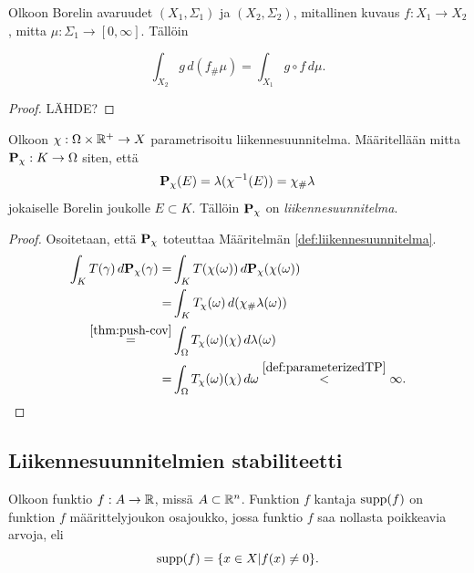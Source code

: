 \begin{theorem}\label{thm:push-cov}
    Olkoon Borelin avaruudet $(X_1, \Sigma_1)$ ja $(X_2, \Sigma_2)$, mitallinen kuvaus $f: X_1 \to X_2$, mitta $\mu:\Sigma_1 \to [0, \infty]$. Tällöin
    
    \begin{equation*}
        \int_{X_2} g \, d(f_{\#} \mu) = \int_{X_1} g \circ f \, d\mu.
    \end{equation*}
\end{theorem}
\begin{proof}
LÄHDE?
\end{proof}

\begin{theorem}
    Olkoon $\chi : \Omega \times \R^+ \to X$ parametrisoitu liikennesuunnitelma.
    Määritellään mitta $\P_\chi : K \to \Omega$ siten, että \[\P_\chi (E) = \lambda(\chi^{-1}(E)) = \chi_\#\lambda\] jokaiselle Borelin joukolle $E\subset K$. 
    Tällöin $\P_\chi$ on \textit{liikennesuunnitelma}. 
\end{theorem}

\begin{proof}
Osoitetaan, että $\P_\chi$ toteuttaa Määritelmän \ref{def:liikennesuunnitelma}.
\begin{align*}
    \int_K T(\gamma)\, d\P_\chi(\gamma) = &\int_K T(\chi(\omega))\, d\P_\chi(\chi(\omega)) \\
    =& \int_K T_\chi(\omega) \, d(\chi_\# \lambda(\omega)) \\
    \stackrel{\ref{thm:push-cov}}{=}& \int_\Omega T_\chi(\omega)(\chi) \, d\lambda(\omega) \\
    =& \int_\Omega T_\chi(\omega)(\chi) \, d\omega \stackrel{\ref{def:parameterizedTP}}{<} \infty.
\end{align*}

\end{proof}



\subsection{Liikennesuunnitelmien {stabiliteetti}}


\begin{definition}
    Olkoon funktio $f:A \to \R$, missä $A\subset \R^n$. Funktion $f$ kantaja $\supp(f)$ on funktion $f$ määrittelyjoukon osajoukko, jossa funktio $f$ saa nollasta poikkeavia arvoja, eli
    \begin{equation*}
        \supp(f) = \{x \in X | f(x) \ne 0\}.
    \end{equation*}
\end{definition}

